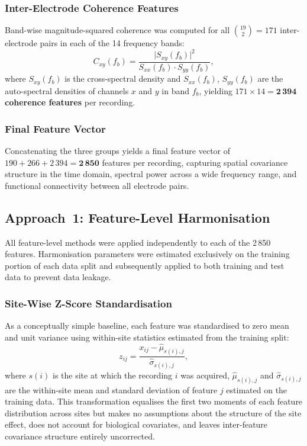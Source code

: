 \documentclass[preprint,12pt]{elsarticle}
\begin{document}
\subsubsection{Inter-Electrode Coherence Features}

Band-wise magnitude-squared coherence was computed for all
$\binom{19}{2} = 171$ inter-electrode pairs in each of the 14
frequency bands:
\begin{equation}
  C_{xy}(f_b) = \frac{\bigl|S_{xy}(f_b)\bigr|^2}
                     {S_{xx}(f_b)\cdot S_{yy}(f_b)},
  \label{eq:coherence}
\end{equation}
where $S_{xy}(f_b)$ is the cross-spectral density and $S_{xx}(f_b)$,
$S_{yy}(f_b)$ are the auto-spectral densities of channels $x$ and $y$
in band $f_b$, yielding $171 \times 14 = \mathbf{2\,394}$
\textbf{coherence features} per recording.

\subsubsection{Final Feature Vector}

Concatenating the three groups yields a final feature vector of
$190 + 266 + 2\,394 = \mathbf{2\,850}$ features per recording,
capturing spatial covariance structure in the time domain, spectral
power across a wide frequency range, and functional connectivity
between all electrode pairs.

\subsection{Approach~1: Feature-Level Harmonisation}
\label{subsec:approach1}

All feature-level methods were applied independently to each of the
2\,850 features.
Harmonisation parameters were estimated exclusively on the training
portion of each data split and subsequently applied to both training
and test data to prevent data leakage.

\subsubsection{Site-Wise Z-Score Standardisation}
\label{subsubsec:sitewise}

As a conceptually simple baseline, each feature was standardised to
zero mean and unit variance using within-site statistics estimated
from the training split:
\begin{equation}
  z_{ij} = \frac{x_{ij} - \hat{\mu}_{s(i),j}}
                {\hat{\sigma}_{s(i),j}},
  \label{eq:sitewise}
\end{equation}
where $s(i)$ is the site at which the recording $i$ was acquired, $\hat{\mu}_{s(i),j}$ and $\hat{\sigma}_{s(i),j}$ are the
within-site mean and standard deviation of feature $j$ estimated on
the training data.
This transformation equalises the first two moments of each feature
distribution across sites but makes no assumptions about the structure
of the site effect, does not account for biological covariates, and
leaves inter-feature covariance structure entirely uncorrected.
\end{document}
